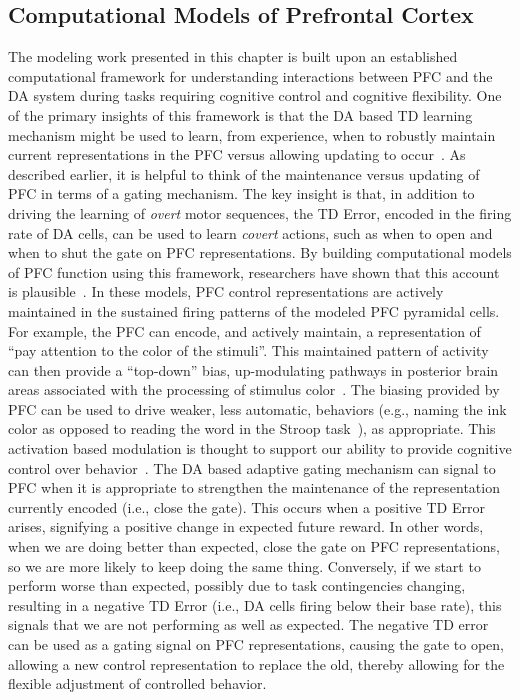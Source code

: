 


\subsection{Computational Models of Prefrontal Cortex}
The modeling work presented in this chapter is built upon an established computational framework for understanding interactions between PFC and the DA system during tasks requiring cognitive control and cognitive flexibility. One of the primary insights of this framework is that the DA based TD learning mechanism might be used to learn, from experience, when to robustly maintain current representations in the PFC versus allowing updating to occur~\cite{BraverTS:2000:Control}. As described earlier, it is helpful to think of the maintenance versus updating of PFC in terms of a gating mechanism. The key insight is that, in addition to driving the learning of \emph{overt} motor sequences, the TD Error, encoded in the firing rate of DA cells, can be used to learn \emph{covert} actions, such as when to open and when to shut the gate on PFC representations. By building computational models of PFC function using this framework, researchers have shown that this account is plausible~\cite{BraverTS:2000:Control}. In these models, PFC control representations are actively maintained in the sustained firing patterns of the modeled PFC pyramidal cells. For example, the PFC can encode, and actively maintain, a representation of ``pay attention to the color of the stimuli''. This maintained pattern of activity can then provide a ``top-down'' bias, up-modulating pathways in posterior brain areas associated with the processing of stimulus color~\cite{CohenJD:1990:Stroop}. The biasing provided by PFC can be used to drive weaker, less automatic, behaviors (e.g., naming the ink color as opposed to reading the word in the Stroop task~\cite{StroopJR:1935:Interference}), as appropriate. This activation based modulation is thought to support our ability to provide cognitive control over behavior~\cite{CohenJD:1992:Schizophrenia}. The DA based adaptive gating mechanism can signal to PFC when it is appropriate to strengthen the maintenance of the representation currently encoded (i.e., close the gate). This occurs when a positive TD Error arises, signifying a positive change in expected future reward. In other words, when we are doing better than expected, close the gate on PFC representations, so we are more likely to keep doing the same thing. Conversely, if we start to perform worse than expected, possibly due to task contingencies changing, resulting in a negative TD Error (i.e., DA cells firing below their base rate), this signals that we are not performing as well as expected. The negative TD error can be used as a gating signal on PFC representations, causing the gate to open, allowing a new control representation to replace the old, thereby allowing for the flexible adjustment of controlled behavior.

